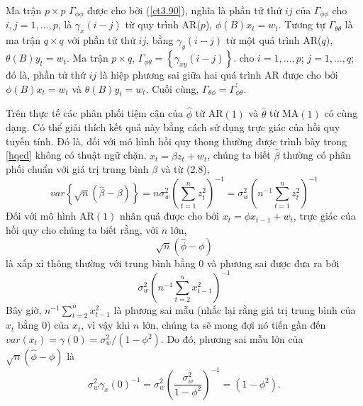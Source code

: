 \documentclass[12pt, a4paper,oneside]{book}
\theoremstyle{definition}
\begin{document}
Ma trận $ p \times p $  $ \Gamma_{\phi\phi}  $
được cho bởi (\ref{ct3.90}), nghĩa là phần tử thứ $ ij $ của $ \Gamma_{\phi\phi}  $ cho
$ i, j = 1 ,. . . , p $, là $ \gamma_{x}(i-j) $ từ quy trình AR($ p $), $ \phi (B)x_{t}=w_{t} $. Tương tự $ \Gamma_{\theta\theta} $ là ma trận $ q \times q $ với phần tử thứ $ ij $, bằng $ \gamma_{y}(i-j) $ từ một quá trình AR($ q $), $ \theta(B)y_{t}=w_{t} $. Ma trận $ p \times q $, $ \Gamma_{\phi\theta} = \left\lbrace \gamma_{xy}(i-j)\right\rbrace  $. cho $ i = 1 ,. . . , p $; $ j = 1 ,. . . , q $; đó là, phần tử thứ $ ij $ là hiệp phương sai giữa hai quá trình AR được cho bởi $ \phi (B)x_{t}=w_{t} $ và $ \theta(B)y_{t}=w_{t} $. Cuối cùng, $ \Gamma_{\theta\phi}= \Gamma_{\phi\theta}^{\prime}$.


Trên thực tế các phân phối tiệm cận của $ \hat{\phi} $ từ AR$(1)$ và $ \hat{\theta} $ từ MA$(1)$ có cùng dạng. Có thể giải thích kết quả này bằng cách sử dụng trực giác của hồi quy tuyến tính. Đó là, đối với mô hình hồi quy thong thường được trình bày trong \ref{hqcd} không có thuật ngữ chặn, $ x_{t}=\beta z_{t}+w_{t} $, chúng ta biết $ \hat{\beta}$ thường có phân phối chuẩn với giá trị trung bình $\beta$ và từ (2.8),
$$ var\left\lbrace \sqrt{n}(\hat{\beta}-\beta)\right\rbrace=n\sigma_{w}^2(\sum_{t=1}^{n}z^2_{t})^{-1}=\sigma_{w}^2(n^{-1}\sum_{t=1}^{n}z^2_{t})^{-1} $$
Đối với mô hình AR$(1)$ nhân quả được cho bởi $ x_{t}=\phi x_{t-1}+w_{t} $, trực giác của hồi quy cho chúng ta biết rằng, với $ n $ lớn,
$$ \sqrt{n}(\hat{\phi}-\phi) $$
là xấp xỉ thông thường với trung bình bằng $0$ và phương sai được đưa ra bởi
$$ \sigma_{w}^2(n^{-1}\sum_{t=2}^{n}x^2_{t-1})^{-1} $$
Bây giờ, $ n^{-1}\sum_{t=2}^{n}x^2_{t-1} $ là phương sai mẫu (nhắc lại rằng giá trị trung bình của $ x_{t} $ bằng 0) của $x_{t}$, vì vậy khi $ n $ lớn, chúng ta sẽ mong đợi nó tiến gần đến $var(x_{t})=\gamma(0)=\sigma_{w}^2/(1-\phi^{2})$. Do đó, phương sai mẫu lớn của $ \sqrt{n}(\hat{\phi}-\phi) $ là
$$ \sigma_{w}^2\gamma_x(0)^{-1}=\sigma_{w}^2(\dfrac{\sigma_{w}^2}{1-\phi^{2}})^{-1}=(1-\phi^{2}).$$
\end{document}
